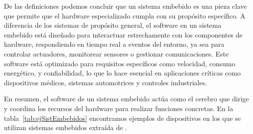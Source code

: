 De las definiciones podemos concluir que un sistema embebido es una pieza clave que permite que el hardware especializado cumpla con su propósito específico. A diferencia de los sistemas de propósito general, el software en un sistema embebido está diseñado para interactuar estrechamente con los componentes de hardware, respondiendo en tiempo real a eventos del entorno, ya sea para controlar actuadores, monitorear sensores o gestionar comunicaciones. Este software está optimizado para requisitos específicos como velocidad, consumo energético, y confiabilidad, lo que lo hace esencial en aplicaciones críticas como dispositivos médicos, sistemas automotrices y controles industriales.
	
En resumen, el software de un sistema embebido actúa como el cerebro que dirige y coordina los recursos del hardware para realizar funciones concretas. En la tabla~\ref{tab:ejSistEmbebidos} encontramos ejemplos de dispositivos en los que se utilizan sistemas embebidos extraída de \cite{noergaard2005embedded}.

